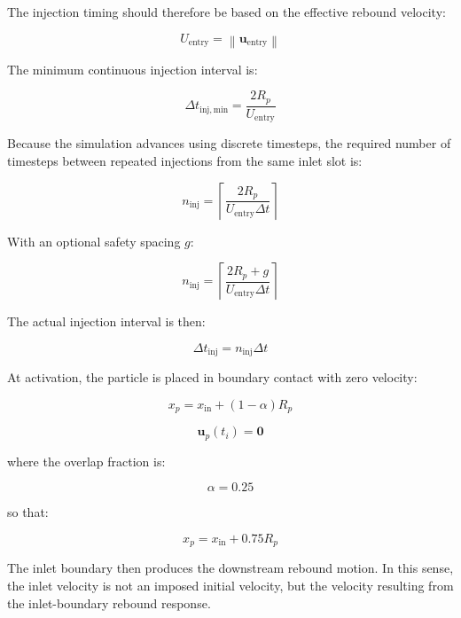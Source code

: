 \documentclass[11pt]{article}
\begin{document}
The injection timing should therefore be based on the effective rebound velocity:

\begin{equation}
U_{\mathrm{entry}}
=
\left\|
\mathbf{u}_{\mathrm{entry}}
\right\|
\end{equation}

The minimum continuous injection interval is:

\begin{equation}
\Delta t_{\mathrm{inj,min}}
=
\frac{2R_p}{U_{\mathrm{entry}}}
\end{equation}

Because the simulation advances using discrete timesteps, the required number of timesteps between repeated injections from the same inlet slot is:

\begin{equation}
n_{\mathrm{inj}}
=
\left\lceil
\frac{2R_p}
     {U_{\mathrm{entry}}\Delta t}
\right\rceil
\end{equation}

With an optional safety spacing $g$:

\begin{equation}
n_{\mathrm{inj}}
=
\left\lceil
\frac{2R_p + g}
     {U_{\mathrm{entry}}\Delta t}
\right\rceil
\end{equation}

The actual injection interval is then:

\begin{equation}
\Delta t_{\mathrm{inj}}
=
n_{\mathrm{inj}}\Delta t
\end{equation}

At activation, the particle is placed in boundary contact with zero velocity:

\begin{equation}
x_p
=
x_{\mathrm{in}}
+
(1-\alpha)R_p
\end{equation}

\begin{equation}
\mathbf{u}_p(t_i)
=
\mathbf{0}
\end{equation}

where the overlap fraction is:

\begin{equation}
\alpha = 0.25
\end{equation}

so that:

\begin{equation}
x_p
=
x_{\mathrm{in}}
+
0.75R_p
\end{equation}

The inlet boundary then produces the downstream rebound motion. In this sense, the inlet velocity is not an imposed initial velocity, but the velocity resulting from the inlet-boundary rebound response.
\end{document}
